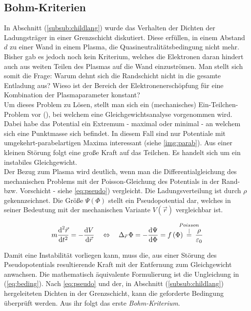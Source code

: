 \documentclass[numbers=noenddot,a4paper,notitlepage,twoside,BCOR15mm]{scrbook}
\newcommand{\diff}{\textnormal{d}}
\newcommand{\ix}[1]{_\text{#1}}
\newcommand{\tilt}[1]{\textit{#1}}
\begin{document}
		\subsection{Bohm-Kriterien}

			In Abschnitt (\ref{subsub:childlang}) wurde das Verhalten der Dichten der Ladungstr\"ager in einer Grenzschicht diskutiert. Diese erf\"ullen, in einem Abstand $d$ zu einer Wand in einem Plasma, die Quasineutralit\"atsbedingung nicht mehr. Bisher gab es jedoch noch kein Kriterium, welches die Elektronen daran hindert auch aus weiten Teilen des Plasmas auf die Wand einzustr\"omen. Man stellt sich somit die Frage: Warum dehnt sich die Randschicht nicht in die gesamte Entladung aus? Wieso ist der Bereich der Elektronenersch\"opfung f\"ur eine Kombination der Plasmaparameter konstant? \\
			Um dieses Problem zu L\"osen, stellt man sich ein (mechanisches) Ein-Teilchen-Problem vor (\cite{Piel10}), bei welchem eine Gleichgewichtsanalyse vorgenommen wird. Dabei habe das Potential ein Extremum - maximal oder minimal - an welchem sich eine Punktmasse sich befindet. In diesem Fall sind nur Potentiale mit umgekehrt-parabelartigen Maxima interessant (siehe \autoref{img:parab}). Aus einer kleinen St\"orung folgt eine gro{\ss}e Kraft auf das Teilchen. Es handelt sich um ein instabiles Gleichgewicht.\\
			Der Bezug zum Plasma wird deutlich, wenn man die Differentialgleichung des mechanischen Problems mit der Poisson-Gleichung des Potentials in der Rand- bzw. Vorschicht - siehe \autoref{eq:pseudo}) vergleicht. Die Ladungsverteilung ist durch $\rho$ gekennzeichnet. Die Größe $\Psi\left(\Phi\right)$ stellt ein Pseudopotential dar, welches in seiner Bedeutung mit der mechanischen Variante $V\left(\vec{r}\right)$ vergleichbar ist.

				\begin{align}
					m\frac{\diff^{2}\vec{r}}{\diff t^{2}}=-\frac{\diff V}{\diff\vec{r}} \quad \Leftrightarrow \quad \Delta_{\vec{r}}\,\Phi=-\frac{\diff\Psi}{\diff\Phi}=f\left(\Phi\right)\hspace{-0.3cm}\overset{Poisson}{\overset{\mid}{=}}\hspace{-0.3cm}\frac{\rho}{\varepsilon\ix{0}} \label{eq:pseudo}
				\end{align}

			Damit eine Instabilit\"at vorliegen kann, muss die, aus einer St\"orung des Pseudopotentials resultierende Kraft mit der Entfernung zum Gleichgewicht anwachsen. Die mathematisch \"aquivalente Formulierung ist die Ungleichung in (\ref{eq:beding}). Nach \autoref{eq:pseudo} und der, in Abschnitt (\ref{subsub:childlang}) hergeleiteten Dichten in der Grenzschicht, kann die geforderte Bedingung \"uberpr\"uft werden. Aus ihr folgt das erste \tilt{Bohm-Kriterium}.
\end{document}
